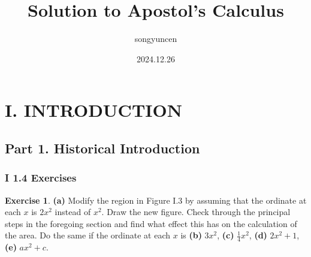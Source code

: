 \documentclass[11pt,a4paper]{book}
\title{Solution to Apostol's Calculus}
\author{songyuncen}
\date{2024.12.26}
\theoremstyle{definition}
\newtheorem{exercise}{Exercise}
\begin{document}
\maketitle
\chapter*{I. INTRODUCTION}
\section*{Part 1. Historical Introduction}
\subsection*{I 1.4 Exercises}


\begin{exercise}
  \textbf{(a)} Modify the region in Figure I.3 by assuming that the ordinate at each $x$  is $2x^2$ instead of $x^2$.
  Draw the new figure. Check through the principal steps in the foregoing section and 
  find what effect this has on the calculation of the area. Do the same if the ordinate
  at each $x$ is \textbf{(b)} $3x^2$, \textbf{(c)} $\frac{1}{4}x^2$, \textbf{(d)} $2x^2 + 1$, \textbf{(e)} $ax^2 + c$.
\end{exercise}
\end{document}
